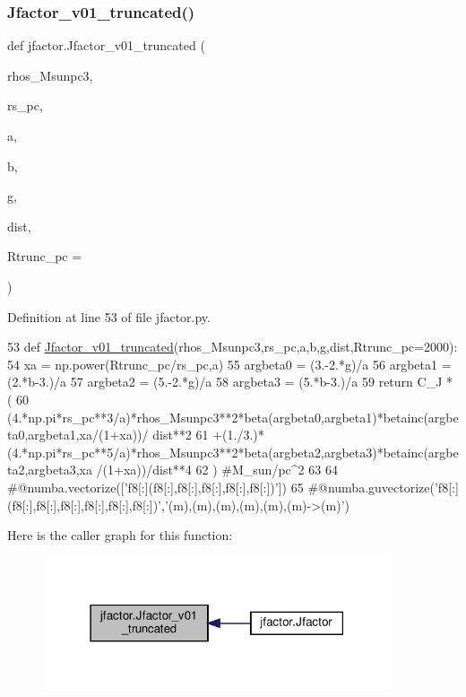 \subsubsection{\texorpdfstring{Jfactor\+\_\+v01\+\_\+truncated()}{Jfactor\_v01\_truncated()}}
{\footnotesize\ttfamily def jfactor.\+Jfactor\+\_\+v01\+\_\+truncated (\begin{DoxyParamCaption}\item[{}]{rhos\+\_\+\+Msunpc3,  }\item[{}]{rs\+\_\+pc,  }\item[{}]{a,  }\item[{}]{b,  }\item[{}]{g,  }\item[{}]{dist,  }\item[{}]{Rtrunc\+\_\+pc = {} }\end{DoxyParamCaption})}



Definition at line 53 of file jfactor.\+py.


\begin{DoxyCode}
53 \textcolor{keyword}{def }\hyperlink{namespacejfactor_afd0f5558d89189557900a6a1503261b3}{Jfactor\_v01\_truncated}(rhos\_Msunpc3,rs\_pc,a,b,g,dist,Rtrunc\_pc=2000):
54     xa = np.power(Rtrunc\_pc/rs\_pc,a)
55     argbeta0 = (3.-2.*g)/a
56     argbeta1 = (2.*b-3.)/a
57     argbeta2 = (5.-2.*g)/a
58     argbeta3 = (5.*b-3.)/a
59     \textcolor{keywordflow}{return} C\_J * (
60         (4.*np.pi*rs\_pc**3/a)*rhos\_Msunpc3**2*beta(argbeta0,argbeta1)*betainc(argbeta0,argbeta1,xa/(1+xa))/
      dist**2
61         +(1./3.)*(4.*np.pi*rs\_pc**5/a)*rhos\_Msunpc3**2*beta(argbeta2,argbeta3)*betainc(argbeta2,argbeta3,xa
      /(1+xa))/dist**4
62         ) \textcolor{comment}{#M\_sun/pc^2}
63   
64 \textcolor{comment}{#@numba.vectorize(['f8[:](f8[:],f8[:],f8[:],f8[:],f8[:])'])}
65 \textcolor{comment}{#@numba.guvectorize('f8[:](f8[:],f8[:],f8[:],f8[:],f8[:],f8[:])','(m),(m),(m),(m),(m),(m)->(m)')}
\end{DoxyCode}
Here is the caller graph for this function\+:\nopagebreak
\begin{figure}[H]
\begin{center}
\leavevmode
\includegraphics[width=291pt]{de/d47/namespacejfactor_afd0f5558d89189557900a6a1503261b3_icgraph}
\end{center}
\end{figure}
\mbox{\label{namespacejfactor_aaa43ebb0d9314fc697123b204465286e}} 
